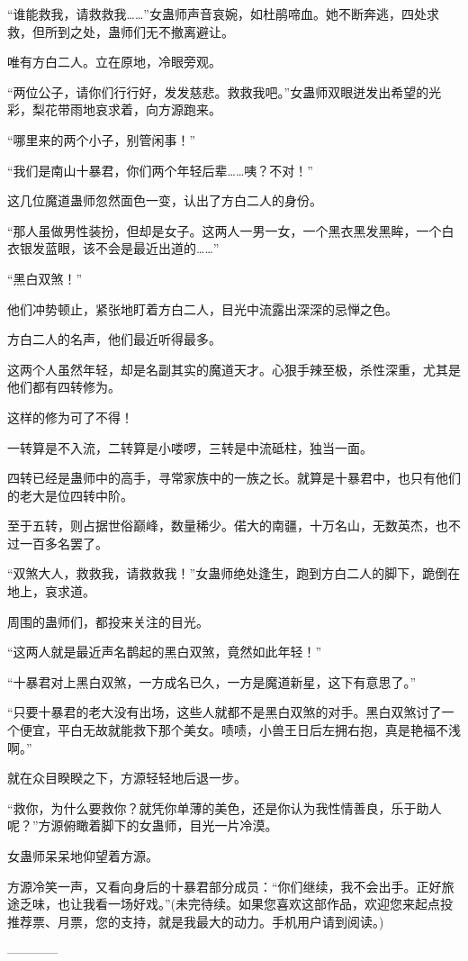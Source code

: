 \begin{this_body}
“谁能救我，请救救我……”女蛊师声音哀婉，如杜鹃啼血。她不断奔逃，四处求救，但所到之处，蛊师们无不撤离避让。

唯有方白二人。立在原地，冷眼旁观。

“两位公子，请你们行行好，发发慈悲。救救我吧。”女蛊师双眼迸发出希望的光彩，梨花带雨地哀求着，向方源跑来。

“哪里来的两个小子，别管闲事！”

“我们是南山十暴君，你们两个年轻后辈……咦？不对！”

这几位魔道蛊师忽然面色一变，认出了方白二人的身份。

“那人虽做男性装扮，但却是女子。这两人一男一女，一个黑衣黑发黑眸，一个白衣银发蓝眼，该不会是最近出道的……”

“黑白双煞！”

他们冲势顿止，紧张地盯着方白二人，目光中流露出深深的忌惮之色。

方白二人的名声，他们最近听得最多。

这两个人虽然年轻，却是名副其实的魔道天才。心狠手辣至极，杀性深重，尤其是他们都有四转修为。

这样的修为可了不得！

一转算是不入流，二转算是小喽啰，三转是中流砥柱，独当一面。

四转已经是蛊师中的高手，寻常家族中的一族之长。就算是十暴君中，也只有他们的老大是位四转中阶。

至于五转，则占据世俗巅峰，数量稀少。偌大的南疆，十万名山，无数英杰，也不过一百多名罢了。

“双煞大人，救救我，请救救我！”女蛊师绝处逢生，跑到方白二人的脚下，跪倒在地上，哀求道。

周围的蛊师们，都投来关注的目光。

“这两人就是最近声名鹊起的黑白双煞，竟然如此年轻！”

“十暴君对上黑白双煞，一方成名已久，一方是魔道新星，这下有意思了。”

“只要十暴君的老大没有出场，这些人就都不是黑白双煞的对手。黑白双煞讨了一个便宜，平白无故就能救下那个美女。啧啧，小兽王日后左拥右抱，真是艳福不浅啊。”

就在众目睽睽之下，方源轻轻地后退一步。

“救你，为什么要救你？就凭你单薄的美色，还是你认为我性情善良，乐于助人呢？”方源俯瞰着脚下的女蛊师，目光一片冷漠。

女蛊师呆呆地仰望着方源。

方源冷笑一声，又看向身后的十暴君部分成员：“你们继续，我不会出手。正好旅途乏味，也让我看一场好戏。”(未完待续。如果您喜欢这部作品，欢迎您来起点投推荐票、月票，您的支持，就是我最大的动力。手机用户请到阅读。)

------------

\end{this_body}

